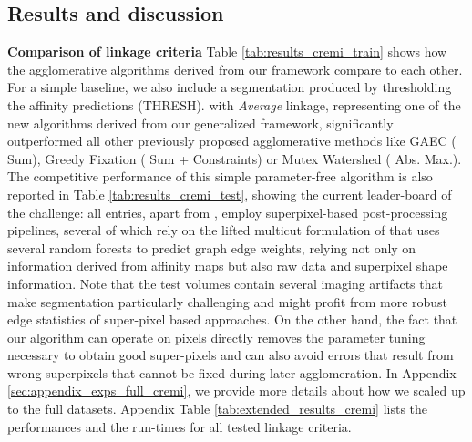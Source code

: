 
\subsection{Results and discussion}\label{sec:results}
\textbf{Comparison of linkage criteria} Table \ref{tab:results_cremi_train} shows how the agglomerative algorithms derived from our framework compare to each other. For a simple baseline, we also include a segmentation produced by thresholding the affinity predictions (THRESH).
\algname{} with \emph{Average} linkage, representing one of the new algorithms derived from our generalized framework, significantly outperformed all other previously proposed agglomerative methods like GAEC \cite{keuper2015efficient} (\algname{} Sum), Greedy Fixation \cite{levinkov2017comparative} (\algname{} Sum + Constraints) or Mutex Watershed \cite{wolf2018mutex} (\algname{} Abs. Max.). The competitive performance of this simple parameter-free algorithm is also reported in Table \ref{tab:results_cremi_test}, showing the current leader-board of the challenge: all entries, apart from \algname{}, employ superpixel-based post-processing pipelines, several of which rely on the lifted multicut formulation of \cite{beier2017multicut} that uses several random forests to predict graph edge weights, relying not only on information derived from affinity maps but also raw data and superpixel shape information.
Note that the test volumes contain several imaging artifacts that make segmentation particularly challenging and might profit from more robust edge statistics of super-pixel based approaches.
On the other hand, the fact that our algorithm can operate on pixels directly removes the parameter tuning necessary to obtain good super-pixels and can also avoid errors that result from wrong superpixels that cannot be fixed during later agglomeration.
In Appendix \ref{sec:appendix_exps_full_cremi}, we provide more details about how we scaled up \algname{} to the full datasets. Appendix Table \ref{tab:extended_results_cremi} lists the performances and the run-times for all tested \algname{} linkage criteria.





